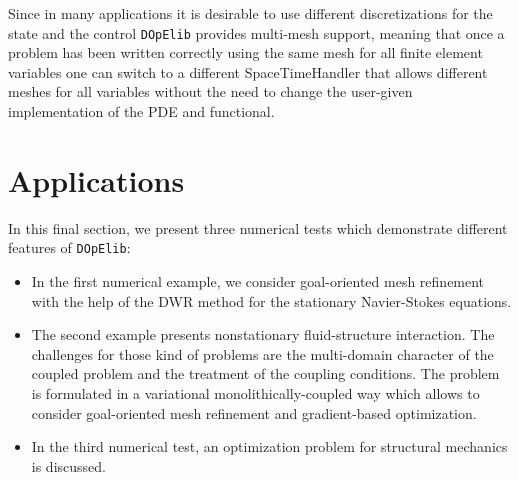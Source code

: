 \documentclass[smallextended]{svjour3}       %
\numberwithin{equation}{section}
\newcommand{\dope}{\texttt{DOpElib}}
\begin{document}
Since in many applications it is desirable to use different discretizations
for the state and the control \dope{} provides multi-mesh support, meaning that
once a problem has been written correctly using the same mesh for all finite element
variables one can switch to a different SpaceTimeHandler that allows different meshes for all 
variables without the need to change the user-given implementation of the PDE and functional.

\section{Applications}
\label{applications}
In this final section, 
we present three numerical tests which demonstrate different
features of \dope{}:
\begin{itemize}
\item In the first numerical example, we consider 
goal-oriented mesh refinement with the help of the 
DWR method for the stationary Navier-Stokes equations.
\item The second example presents nonstationary fluid-structure 
interaction. The challenges for those kind of problems are the multi-domain
character of the coupled problem and the treatment of the coupling conditions.
The problem is formulated in a variational monolithically-coupled way which 
allows to consider goal-oriented mesh refinement and gradient-based optimization.
\item In the third numerical test, an optimization problem for structural mechanics
is discussed.
\end{itemize}
\end{document}
